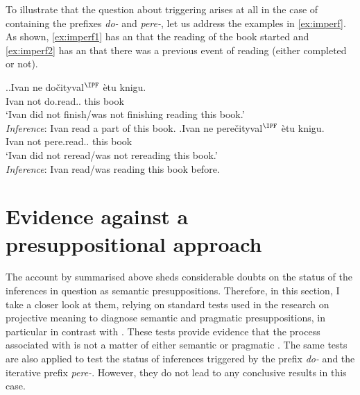 
To illustrate that the question about  triggering arises at all in the case of  containing the prefixes \textit{do-} and \textit{pere-}, let us address the examples in \ref{ex:imperf}. As shown,  \ref{ex:imperf1} has an  that the reading of the book started and \ref{ex:imperf2} has an  that there was a previous event of reading (either completed or not).

\ex.\label{ex:imperf}\ag.\label{ex:imperf1}Ivan ne do\v{c}ityval$^{\IPF}$ \`{e}tu knigu.\\
Ivan not do.read.. this book\\
\trans `Ivan did not finish/was not finishing reading this book.'\\
\textit{Inference}: Ivan read a part of this book.
\bg.\label{ex:imperf2}Ivan ne pere\v{c}ityval$^{\IPF}$ \`{e}tu knigu.\\
Ivan not pere.read.. this book\\
\trans `Ivan did not reread/was not rereading this book.'\\
\textit{Inference}: Ivan read/was reading this book before.

\section{Evidence against a presuppositional approach}\label{sec:pragm:tests}
The account by \citet{Gronn:04, Gronn:06} summarised above sheds considerable doubts on the status of the inferences in question as semantic presuppositions. Therefore, in this section, I take a closer look at them, relying on standard tests used in the research on projective meaning to diagnose semantic and pragmatic presuppositions, in particular in contrast with . These tests provide evidence that the process  associated with  is not a matter of either semantic or pragmatic . The same tests are also applied to test the status of inferences triggered by the  prefix \textit{do-} and the iterative prefix \textit{pere-}. However, they do not lead to any conclusive results in this case.
